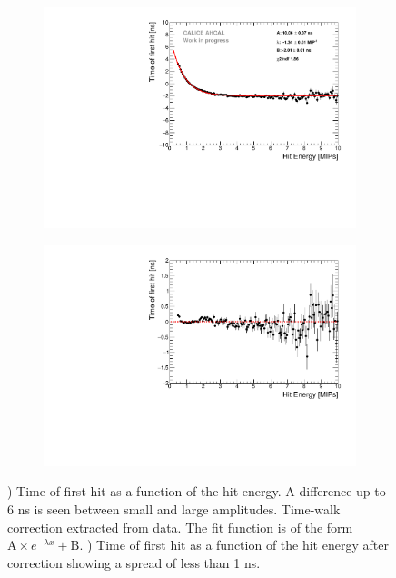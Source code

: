 \begin{figure}[htbp!]
	\begin{subfigure}[t]{0.49\textwidth}
		\centering
		\includegraphics[width=1\textwidth]{../Thesis_Plots/Timing/Muons/Plots/TimeWalkProfile.pdf}
		\caption{}\label{fig:time_walk}
	\end{subfigure}
	\hfill
	\begin{subfigure}[t]{0.49\textwidth}
		\centering
		\includegraphics[width=1\textwidth]{../Thesis_Plots/Timing/Muons/Plots/TimeWalkProfile_Correction.pdf}
		\caption{}\label{fig:time_walk_corr}
	\end{subfigure}
	\caption{) Time of first hit as a function of the hit energy. A difference up to 6 ns is seen between small and large amplitudes. Time-walk correction extracted from data. The fit function is of the form $\text{A} \times e^{-\lambda{}x} + \text{B}$. ) Time of first hit as a function of the hit energy after correction showing a spread of less than 1 ns.}
\end{figure}

